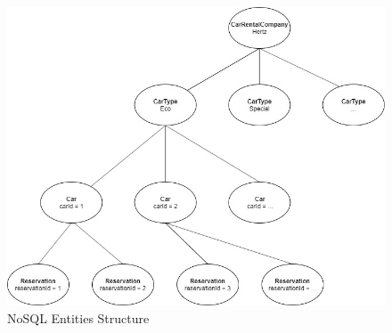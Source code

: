 \documentclass{ds-report}
\begin{document}
\begin{figure}
  \includegraphics[width=\linewidth]{GAE_opdracht_2_structure.jpg}
  \caption{NoSQL Entities Structure}
  \label{fig:structure}
\end{figure}

	
	\clearpage


	
\end{document}
